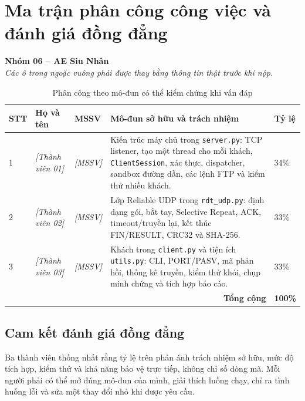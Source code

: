 \section{Ma trận phân công công việc và đánh giá đồng đẳng}

\noindent\textbf{Nhóm 06 -- AE Siu Nhân}\\
\textit{Các ô trong ngoặc vuông phải được thay bằng thông tin thật trước khi nộp.}

\begin{table}[H]
\centering\small
\renewcommand{\arraystretch}{1.35}
\begin{tabular}{|p{.7cm}|p{2.8cm}|p{1.8cm}|p{6.7cm}|p{1.1cm}|}
\hline
\textbf{STT}&\textbf{Họ và tên}&\textbf{MSSV}&\textbf{Mô-đun sở hữu và trách nhiệm}&\textbf{Tỷ lệ}\\\hline
1&\textit{[Thành viên 01]}&\textit{[MSSV]}&Kiến trúc máy chủ trong \texttt{server.py}: TCP listener, tạo một thread cho mỗi khách, \texttt{ClientSession}, xác thực, dispatcher, sandbox đường dẫn, các lệnh FTP và kiểm thử nhiều khách.&34\%\\\hline
2&\textit{[Thành viên 02]}&\textit{[MSSV]}&Lớp Reliable UDP trong \texttt{rdt\_udp.py}: định dạng gói, bắt tay, Selective Repeat, ACK, timeout/truyền lại, kết thúc FIN/RESULT, CRC32 và SHA-256.&33\%\\\hline
3&\textit{[Thành viên 03]}&\textit{[MSSV]}&Khách trong \texttt{client.py} và tiện ích \texttt{utils.py}: CLI, PORT/PASV, mã phản hồi, thống kê truyền, kiểm thử khói, chụp minh chứng và tích hợp báo cáo.&33\%\\\hline
\multicolumn{4}{|r|}{\textbf{Tổng cộng}}&\textbf{100\%}\\\hline
\end{tabular}
\caption{Phân công theo mô-đun có thể kiểm chứng khi vấn đáp}
\label{tab:task-matrix}
\end{table}

\subsection{Cam kết đánh giá đồng đẳng}

Ba thành viên thống nhất rằng tỷ lệ trên phản ánh trách nhiệm sở hữu, mức độ tích hợp, kiểm thử và khả năng bảo vệ trực tiếp, không chỉ số dòng mã. Mỗi người phải có thể mở đúng mô-đun của mình, giải thích luồng chạy, chỉ ra tình huống lỗi và sửa một thay đổi nhỏ khi được yêu cầu.

